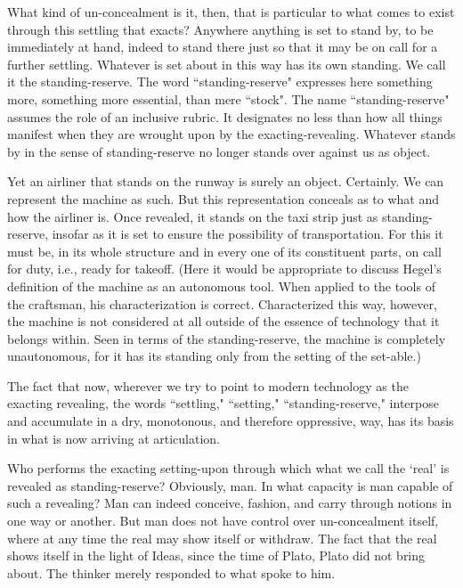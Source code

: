 \documentclass[paper=a4, fontsize=11pt,twoside]{scrartcl}
\begin{document}
What kind of un-concealment is it, then, that is particular to what comes to exist through this settling that exacts? Anywhere anything is set to stand by, to be immediately at hand, indeed to stand there just so that it may be on call for a further settling. Whatever is set about in this way has its own standing. We call it the standing-reserve. The word ``standing-reserve" expresses here something more, something more essential, than mere ``stock". The name ``standing-reserve" assumes the role of an inclusive rubric. It designates no less than how all things manifest when they are wrought upon by the exacting-revealing. Whatever stands by in the sense of standing-reserve no longer stands over against us as object.

Yet an airliner that stands on the runway is surely an object. Certainly. We can represent the machine as such. But this representation conceals as to what and how the airliner is. Once revealed, it stands on the taxi strip just as standing-reserve, insofar as it is set to ensure the possibility of transportation. For this it must be, in its whole structure and in every one of its constituent parts, on call for duty, i.e., ready for takeoff. (Here it would be appropriate to discuss Hegel's definition of the machine as an autonomous tool. When applied to the tools of the craftsman, his characterization is correct. Characterized this way, however, the machine is not considered at all outside of the essence of technology that it belongs within. Seen in terms of the standing-reserve, the machine is completely unautonomous, for it has its standing only from the setting of the set-able.)

The fact that now, wherever we try to point to modern technology as the exacting revealing, the words ``settling," ``setting," ``standing-reserve," interpose and accumulate in a dry, monotonous, and therefore oppressive, way, has its basis in what is now arriving at articulation.

Who performs the exacting setting-upon through which what we call the `real' is revealed as standing-reserve? Obviously, man. In what capacity is man capable of such a revealing? Man can indeed conceive, fashion, and carry through notions in one way or another. But man does not have control over un-concealment itself, where at any time the real may show itself or withdraw. The fact that the real shows itself in the light of Ideas, since the time of Plato, Plato did not bring about. The thinker merely responded to what spoke to him.
\end{document}
